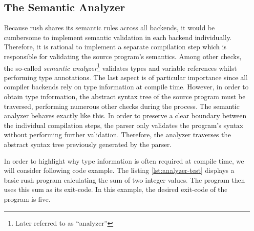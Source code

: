 \subsection{The Semantic Analyzer}
Because rush shares its semantic rules across all backends,
it would be cumbersome to implement semantic validation in each
backend individually. Therefore, it is rational to implement a separate
compilation step which is responsible for validating the source program's semantics.
Among other checks, the so-called \emph{semantic analyzer}\footnote{Later referred to as \enquote{analyzer}} validates types
and variable references whilst performing type annotations. The last aspect is
of particular importance since all compiler backends rely on type information at
compile time. However, in order to obtain type information, the abstract syntax
tree of the source program must be traversed, performing numerous other checks
during the process. The semantic analyzer behaves exactly like this. In order to
preserve a clear boundary between the individual compilation steps, the parser
only validates the program's syntax without performing further validation.
Therefore, the analyzer traverses the abstract syntax tree previously generated
by the parser.

In order to highlight why type information is often required at compile time, we
will consider following code example. The listing \ref{lst:analyzer-test} displays a basic rush program
calculating the sum of two integer values.
The program then uses this sum as its exit-code.
In this example, the desired exit-code of the program is five.


